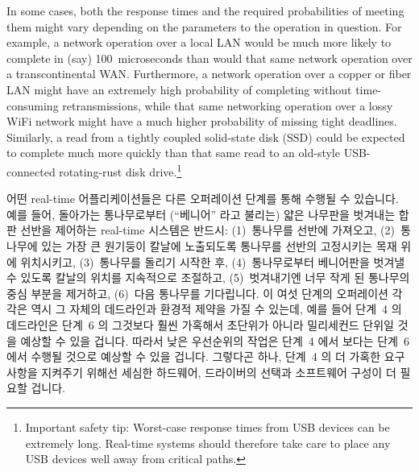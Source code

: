 In some cases, both the response times and the required probabilities of
meeting them might vary depending on the parameters to the operation in
question.
For example, a network operation over a local LAN would be much more likely
to complete in (say) 100~microseconds than would that same network operation
over a transcontinental WAN.
Furthermore, a network operation over a copper or fiber
LAN might have an extremely
high probability of completing without time-consuming retransmissions,
while that same networking operation over a lossy WiFi network might
have a much higher probability of missing tight deadlines.
Similarly, a read from a tightly coupled solid-state disk (SSD) could be
expected to complete much more quickly than that same read to an old-style
USB-connected rotating-rust disk drive.\footnote{
	Important safety tip:  Worst-case response times from USB devices
	can be extremely long.
	Real-time systems should therefore take care to place any USB
	devices well away from critical paths.}
\fi

어떤 real-time 어플리케이션들은 다른 오퍼레이션 단계를 통해 수행될 수 있습니다.
예를 들어, 돌아가는 통나무로부터 (``베니어'' 라고 불리는) 얇은 나무판을
벗겨내는 합판 선반을 제어하는 real-time 시스템은 반드시:
(1)~통나무를 선반에 가져오고,
(2)~통나무에 있는 가장 큰 원기둥이 칼날에 노출되도록 통나무를 선반의 고정시키는
목재 위에 위치시키고,
(3)~통나무를 돌리기 시작한 후,
(4)~통나무로부터 베니어판을 벗겨낼 수 있도록 칼날의 위치를 지속적으로 조절하고,
(5)~벗겨내기엔 너무 작게 된 통나무의 중심 부분을 제거하고,
(6)~다음 통나무를 기다립니다.
이 여섯 단계의 오퍼레이션 각각은 역시 그 자체의 데드라인과 환경적 제약을 가질
수 있는데, 예를 들어 단계~4 의 데드라인은 단계~6 의 그것보다 훨씬 가혹해서
초단위가 아니라 밀리세컨드 단위일 것을 예상할 수 있을 겁니다.
따라서 낮은 우선순위의 작업은 단계~4 에서 보다는 단계~6 에서 수행될 것으로
예상할 수 있을 겁니다.
그렇다곤 하나, 단계~4 의 더 가혹한 요구사항을 지켜주기 위해선 세심한 하드웨어,
드라이버의 선택과 소프트웨어 구성이 더 필요할 겁니다.

